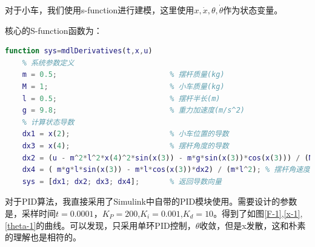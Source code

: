 \documentclass[12pt,a4paper,UTF8]{article}
\begin{document}
对于小车，我们使用s-function进行建模，这里使用$x,\dot{x},\theta,\dot{\theta}$作为状态变量。

核心的S-function函数为：

\begin{lstlisting}[language=Matlab]
function sys=mdlDerivatives(t,x,u)
    % 系统参数定义
    m = 0.5;                          % 摆杆质量(kg)
    M = 1;                            % 小车质量(kg)
    l = 0.5;                          % 摆杆半长(m)
    g = 9.8;                          % 重力加速度(m/s^2)
    % 计算状态导数
    dx1 = x(2);                       % 小车位置的导数
    dx3 = x(4);                       % 摆杆角度的导数
    dx2 = (u - m^2*l^2*x(4)^2*sin(x(3)) - m*g*sin(x(3))*cos(x(3))) / (M + m*sin(x(3))^2);  % 小车速度的导数
    dx4 = ( m*g*l*sin(x(3)) - m*l*cos(x(3))*dx2) / (m*l^2); % 摆杆角速度的导数，注意这里可以使用已经计算过的简化表达
    sys = [dx1; dx2; dx3; dx4];       % 返回导数向量
\end{lstlisting}


对于PID算法，我直接采用了Simulink中自带的PID模块使用。需要设计的参数是，采样时间$t = 0.0001$，$K_P=200$,$K_i=0.001$,$K_d=10$。得到了如图\ref{F-1},\ref{x-1},\ref{theta-1}的曲线。可以发现，只采用单环PID控制，$\theta$收敛，但是x发散，这和朴素的理解也是相符的。
\end{document}
